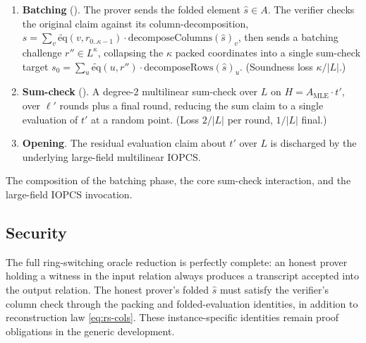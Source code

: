 \begin{enumerate}
  \item \textbf{Batching} (). The prover
    sends the folded element $\hat s \in A$. The verifier checks the original claim against its
    column-decomposition, $s = \sum_v \tilde{\mathrm{eq}}(v, r_{0..\kappa-1})\cdot
    \mathrm{decomposeColumns}(\hat s)_v$, then sends a batching challenge $r'' \in L^\kappa$,
    collapsing the $\kappa$ packed coordinates into a single sum-check target $s_0 = \sum_u
    \tilde{\mathrm{eq}}(u, r'')\cdot \mathrm{decomposeRows}(\hat s)_u$. (Soundness loss
    $\kappa/\lvert L\rvert$.)
  \item \textbf{Sum-check} (). A
    degree-$2$ multilinear sum-check over $L$ on $H = A_{\mathrm{MLE}} \cdot t'$, over $\ell'$ rounds
    plus a final round, reducing the sum claim to a single evaluation of $t'$ at a random point.
    (Loss $2/\lvert L\rvert$ per round, $1/\lvert L\rvert$ final.)
  \item \textbf{Opening}. The residual evaluation claim about $t'$ over $L$ is discharged by the
    underlying large-field multilinear IOPCS.
\end{enumerate}

\begin{definition}
  \label{def:full_ring_switching}
  The composition of the batching phase, the core sum-check interaction, and the large-field IOPCS
  invocation.
\end{definition}

\subsection{Security}

\begin{theorem}
  \label{thm:ring_switching_completeness}
  The full ring-switching oracle reduction is perfectly complete: an honest prover holding a witness
  in the input relation always produces a transcript accepted into the output relation. The honest
  prover's folded $\hat s$ must satisfy the verifier's column check through the packing and
  folded-evaluation identities, in addition to reconstruction law \eqref{eq:rs-cols}. These
  instance-specific identities remain proof obligations in the generic development.
\end{theorem}

